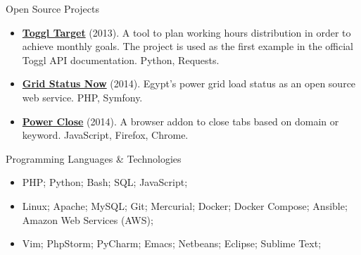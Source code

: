 \documentclass[]{mosabcv}
\begin{document}
	\begin{cvsection}{Open Source Projects}
		\begin{cvsubsection}{}{}{}
			\begin{itemize}
				\item \textbf{\href{https://github.com/mos3abof/toggl_target}{Toggl Target}} (2013). A tool to plan working hours distribution in order to achieve monthly goals. The project is used as the first example in the official Toggl API documentation. Python, Requests.
			
				\item \textbf{\href{https://www.gridstatusnow.com}{Grid Status Now}} (2014). Egypt's power grid load status as an open source web service. PHP, Symfony.
				
				\item \textbf{\href{https://power-close.com/}{Power Close}} (2014). A browser addon to close tabs based on domain or keyword. JavaScript, Firefox, Chrome.
			\end{itemize}
		\end{cvsubsection}
	\end{cvsection}



	\begin{cvsection}{Programming Languages \& Technologies}
		\begin{cvsubsection}{}{}{}	
			\begin{itemize}
				\item PHP; Python; Bash; SQL; JavaScript;
				\item Linux; Apache; MySQL; Git; Mercurial; Docker; Docker Compose; Ansible; Amazon Web Services (AWS);
				\item Vim; PhpStorm; PyCharm; Emacs; Netbeans; Eclipse; Sublime Text;
			\end{itemize}
		\end{cvsubsection}
	\end{cvsection}
	
\end{document}
